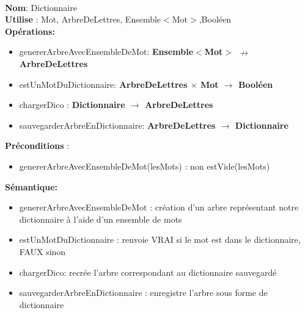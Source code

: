 \documentclass{article}
\begin{document}
    \noindent
    \\
    \textbf{Nom}: Dictionnaire\\
    \textbf{Utilise} : Mot, ArbreDeLettres, Ensemble$<$Mot$>$,Booléen\\
    \textbf{Opérations:} \begin{itemize}[label=$\ $, leftmargin=2cm, itemsep=0cm]
        \item genererArbreAvecEnsembleDeMot: \textbf{Ensemble$<$Mot$>$ $\nrightarrow $ ArbreDeLettres}
        \item estUnMotDuDictionnaire: \textbf{ArbreDeLettres $\times$ Mot $\rightarrow $ Booléen}
        \item chargerDico : \textbf{Dictionnaire $ \rightarrow$ ArbreDeLettres}
        \item sauvegarderArbreEnDictionnaire: \textbf{ArbreDeLettres $\rightarrow$ Dictionnaire}
        
    \end{itemize}
    \textbf{Préconditions} :
    \begin{itemize}[label=$\ $, leftmargin=2cm, itemsep=0cm]
     \item genererArbreAvecEnsembleDeMot(lesMots) : non estVide(lesMots)
     \end{itemize}

    \textbf{Sémantique: }\begin{itemize}[label=$\- $, leftmargin=2cm, itemsep=0cm]
        \item genererArbreAvecEnsembleDeMot : création d'un arbre représentant notre dictionnaire à l'aide d'un ensemble de mots
        \item estUnMotDuDictionnaire : renvoie VRAI si le mot est dans le dictionnaire, FAUX sinon
        \item chargerDico: recrée l'arbre correspondant au dictionnaire sauvegardé
        \item sauvegarderArbreEnDictionnaire : enregistre l'arbre sous forme de dictionnaire
    \end{itemize}
\end{document}
